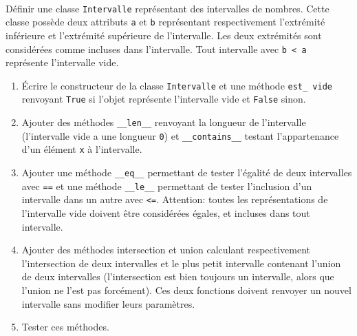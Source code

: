 \documentclass[a4paper,17pt]{extarticle}
\newenvironment{eleve}%
{\begin{activite}\color{noiramu}\\[-0.5cm]}
{\end{activite}}
\providecommand{\tightlist}{%
      \setlength{\itemsep}{0pt}\setlength{\parskip}{0pt}}
\begin{document}
\begin{eleve}
    Définir une classe \texttt{Intervalle} représentant des intervalles de
nombres. Cette classe possède deux attributs \texttt{a} et \texttt{b}
représentant respectivement l'extrémité inférieure et l'extrémité
supérieure de l'intervalle. Les deux extrémités sont considérées comme
incluses dans l'intervalle. Tout intervalle avec
\texttt{b\ \textless{}\ a} représente l'intervalle vide.

\begin{enumerate}
\def\labelenumi{\arabic{enumi}.}
\tightlist
\item
  Écrire le constructeur de la classe \texttt{Intervalle} et une méthode
  \texttt{est\_\ vide} renvoyant \texttt{True} si l'objet représente
  l'intervalle vide et \texttt{False} sinon.
\item
  Ajouter des méthodes \texttt{\_\_len\_\_} renvoyant la longueur de
  l'intervalle (l'intervalle vide a une longueur \texttt{0}) et
  \texttt{\_\_contains\_\_} testant l'appartenance d'un élément
  \texttt{x} à l'intervalle.
\item
  Ajouter une méthode \texttt{\_\_eq\_\_} permettant de tester l'égalité
  de deux intervalles avec \texttt{==} et une méthode
  \texttt{\_\_le\_\_} permettant de tester l'inclusion d'un intervalle
  dans un autre avec \texttt{\textless{}=}. Attention: toutes les
  représentations de l'intervalle vide doivent être considérées égales,
  et incluses dans tout intervalle.
\item
  Ajouter des méthodes intersection et union calculant respectivement
  l'intersection de deux intervalles et le plus petit intervalle
  contenant l'union de deux intervalles (l'intersection est bien
  toujours un intervalle, alors que l'union ne l'est pas forcément). Ces
  deux fonctions doivent renvoyer un nouvel intervalle sans modifier
  leurs paramètres.
\item
  Tester ces méthodes.
\end{enumerate}
        
        \end{eleve}
\end{document}
